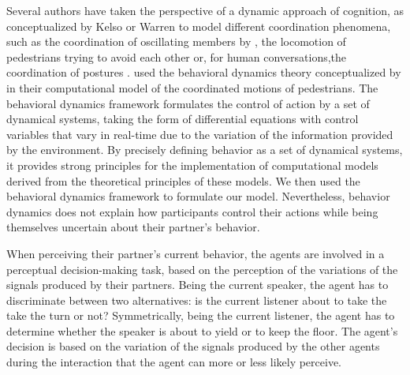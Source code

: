Several authors have taken the perspective of a dynamic approach of cognition, as conceptualized by Kelso \cite{kelso_coordination_2009} or Warren \citep{warren_dynamics_2006} to model different coordination phenomena, such as 
the coordination of oscillating members by \citep{haken_theoretical_1985}, 
the locomotion of pedestrians trying to avoid each other \citep{rio_follow_2014} or, 
for human conversations,the coordination of postures \citep{fowler_language_2008}.
\citep{rio_follow_2014} used the behavioral dynamics theory conceptualized by \citep{warren_dynamics_2006} in their computational model of the coordinated motions of pedestrians. The behavioral dynamics framework formulates the control of action by a set of dynamical systems, taking the form of differential equations with control variables that vary in real-time due to the variation of the information provided by the environment.
By precisely defining behavior as a set of dynamical systems, it provides strong principles for the
implementation of computational models derived from the theoretical principles of these models. 
We then used the behavioral dynamics framework to formulate our model. 
Nevertheless, behavior dynamics does not explain how participants control 
their actions while being themselves uncertain about their partner's behavior. 

When perceiving their partner's current behavior, the agents are involved in a perceptual decision-making task, based on the perception of the variations of the signals produced by their partners. Being the current speaker, the agent has to discriminate between two alternatives: is the current listener about to take the take the turn or not? Symmetrically, being the current listener, the agent has to determine whether the speaker is about to yield or to keep the floor. The agent's decision is based on the variation of the signals produced by the other agents during the interaction that the agent can more or less likely perceive.

